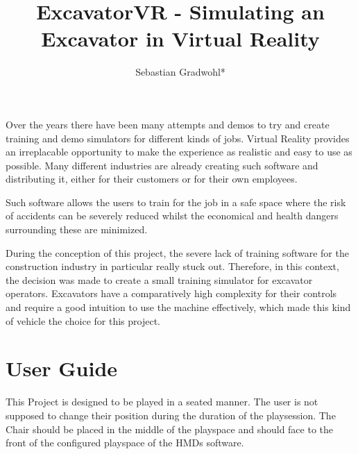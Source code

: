 \documentclass[journal]{vgtc}                     %
\title{ExcavatorVR - Simulating an Excavator in Virtual Reality}
\author{%
  Sebastian Gradwohl*
}
\begin{document}


\maketitle


Over the years there have been many attempts and demos to try and create training and demo simulators for different kinds of jobs. Virtual Reality provides an irreplacable opportunity to make the experience as realistic and easy to use as possible.
Many different industries are already creating such software and distributing it, either for their customers or for their own employees. 

Such software allows the users to train for the job in a safe space where the risk of accidents can be severely reduced whilst the economical and health dangers surrounding these are minimized.

During the conception of this project, the severe lack of training software for the construction industry in particular really stuck out. 
Therefore, in this context, the decision was made to create a small training simulator for excavator operators. Excavators have a comparatively high complexity for their controls and require a good intuition to use the machine effectively, which made this kind of vehicle the choice for this project.

\section{User Guide}

This Project is designed to be played in a seated manner. The user is not supposed to change their position during the duration of the playsession. The Chair should be placed in the middle of the playspace and should face to the front of the configured playspace of the HMDs software.
\end{document}
